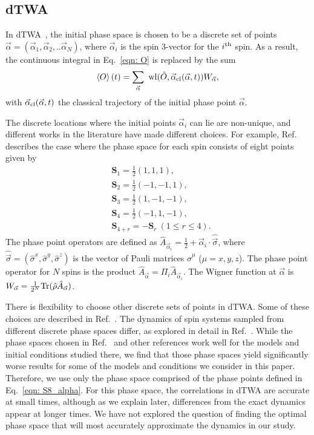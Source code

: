 \documentclass[pra,reprint,superscriptaddress]{revtex4-1}
\newcommand{\expect}[1]{\left\langle #1 \right\rangle}
\begin{document}
\subsection{dTWA}\label{subsec: dTWA}
In dTWA~\cite{schachenmayer2015many, schachenmayer2015dynamics}, the initial phase space is chosen to be a discrete set of points $\vec{\alpha}=(\vec{\alpha}_1,\vec{\alpha}_2,..\vec{\alpha}_N)$, where $\vec{\alpha}_i$ is the spin 3-vector for the $i^{\rm th}$ spin. As a result, the continuous integral in Eq.~\eqref{eqn: O} is replaced by the sum
\begin{equation}
\expect{O}(t) = \sum_{\vec \alpha}~{\rm wl}(\hat{O},\vec{\alpha}_{\rm cl}(\vec\alpha,t))W_{\vec \alpha},
\end{equation}
with $\vec{\alpha}_{\rm cl}(\vec\alpha,t)$ the classical trajectory of the initial phase point $\vec\alpha$.

The discrete locations where the initial points $\vec{\alpha}_i$ can lie are non-unique, and different works in the literature have made different choices. For example, Ref.~\cite{schachenmayer2015many} describes the case where the phase space for each spin consists of eight points given by
\begin{align}\label{eqn: S8_alpha}
&\mathbf{S}_1 = \frac{1}{2}(1,1,1),\nonumber\\
&\mathbf{S}_2 = \frac{1}{2}(-1,-1,1),\nonumber\\
&\mathbf{S}_3 = \frac{1}{2}(1,-1,-1),\nonumber\\
&\mathbf{S}_4 = \frac{1}{2}(-1,1,-1),\nonumber\\
&\mathbf{S}_{4+r} = -\mathbf{S}_r\ (1\leq r\leq4).
\end{align}
The phase point operators are defined as $\hat{A}_{\vec{\alpha}_i} = \frac{1}{2}+\vec{\alpha}_i\cdot\hat{\vec{\sigma}}$, where $\hat{\vec{\sigma}}=(\hat{\sigma}^x,\hat{\sigma}^y,\hat{\sigma}^z)$ is the vector of Pauli matrices $\hat{\sigma}^\mu$ ($\mu=x,y,z$). The phase point operator for $N$ spins is the product $\hat{A}_{\vec\alpha} = \Pi_i \hat{A}_{\vec{\alpha}_i}$. The Wigner function at $\vec{\alpha}$ is $W_{\vec \alpha} = \frac{1}{2^N}{\rm Tr}(\hat{\rho}\hat{A}_{\vec{\alpha}})$.

There is flexibility to choose other discrete sets of points in dTWA. Some of these choices are described in Ref.~\cite{pucci2016simulation}. The dynamics of spin systems sampled from different discrete phase spaces differ, as explored in detail in Ref.~\cite{pucci2016simulation}. While the phase spaces chosen in Ref.~\cite{pucci2016simulation} and other references work well for the models and initial conditions studied there, we find that those phase spaces yield significantly worse results for some of the models and conditions we consider in this paper. Therefore, we use only the phase space comprised of the phase points defined in Eq.~\eqref{eqn: S8_alpha}. For this phase space, the correlations in dTWA are accurate at small times, although as we explain later, differences from the exact dynamics appear at longer times. We have not explored the question of finding the optimal phase space that will most accurately approximate the dynamics in our study.
\end{document}
